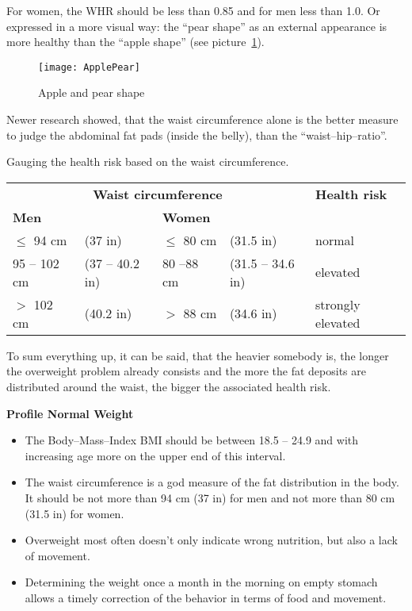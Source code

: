 \documentclass[../main.tex]{subfiles}
\begin{document}
\vspace{2mm}

\noindent For women, the WHR should be less than 0.85 and for men less than 1.0.
Or expressed in a more visual way: the ``pear shape'' as an external appearance is more healthy than the ``apple shape'' (see picture~\ref{Apple}).

\begin{figure}[htb!]
  \centering
  \texttt{[image: ApplePear]}
  \caption{Apple and pear shape}\label{Apple}
\end{figure}

Newer research showed, that the waist circumference alone is the better measure to judge the abdominal fat pads (inside the belly), than the ``waist--hip--ratio''.

Gauging the health risk based on the waist circumference.

\begin{table}[htb!]
  \centering
  \begin{tabular}{lllll}
    \multicolumn{4}{c}{\textbf{Waist circumference}} & \textbf{Health risk} \\
    \textbf{Men} & & \textbf{Women} \\
    \hline
    $\leq$ 94 cm & (37 in) & $\leq$ 80 cm & (31.5 in) & normal \\
    95 -- 102 cm & (37 -- 40.2 in) & 80 --88 cm & (31.5 -- 34.6 in) & elevated \\
    $>$ 102 cm & (40.2 in) & $>$ 88 cm  & (34.6 in) & strongly elevated \\
  \end{tabular}
\end{table}

To sum everything up, it can be said, that the heavier somebody is, the longer the overweight problem already consists
and the more the fat deposits are distributed around the waist, the bigger the associated health risk.

\vspace{5mm}
\noindent
\begin{fminipage}{\textwidth}
  \textbf{Profile Normal Weight}
  \begin{itemize}
  \item The Body--Mass--Index BMI should be between 18.5 -- 24.9 and with increasing age more on the upper end of this interval.
  \item The waist circumference is a god measure of the fat distribution in the body. It should be not more than 94 cm (37 in) for men and not more than 80 cm (31.5 in) for women.
  \item Overweight most often doesn't only indicate wrong nutrition, but also a lack of movement.
    \item Determining the weight once  a month in the morning on empty stomach allows a timely correction of the behavior in terms of food and movement. 
  \end{itemize}
  \end{fminipage}
\end{document}
